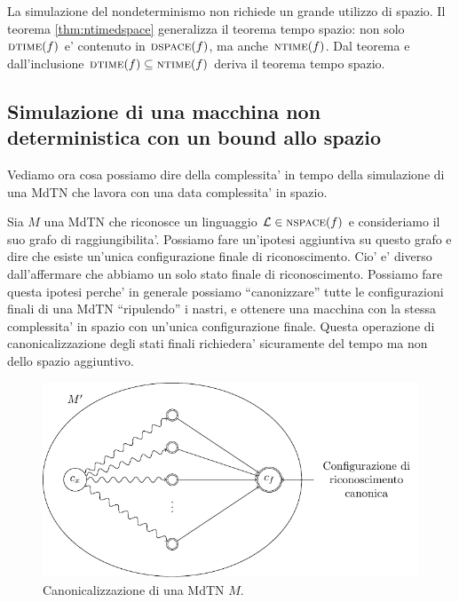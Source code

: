 La simulazione del nondeterminismo non richiede un grande utilizzo di spazio. Il teorema
\ref{thm:ntimedspace} generalizza il teorema tempo spazio: non solo $\textsc{dtime}(f)$ e' contenuto in
$\textsc{dspace}(f)$, ma anche $\textsc{ntime}(f)$. Dal teorema e dall'inclusione $\textsc{dtime}(f) \subseteq \textsc{ntime}(f)$
deriva il teorema tempo spazio.

\subsection{Simulazione di una macchina non deterministica con un bound allo spazio}

Vediamo ora cosa possiamo dire della complessita' in tempo della simulazione di una MdTN che lavora
con una data complessita' in spazio.

Sia $M$ una MdTN che riconosce un linguaggio $\mathcal{L} \in \textsc{nspace}(f)$ e consideriamo il suo grafo di
raggiungibilita'. Possiamo fare un'ipotesi aggiuntiva su questo grafo e dire che esiste un'unica
configurazione finale di riconoscimento. Cio' e' diverso dall'affermare che abbiamo un solo stato
finale di riconoscimento. Possiamo fare questa ipotesi perche' in generale possiamo ``canonizzare''
tutte le configurazioni finali di una MdTN ``ripulendo'' i nastri, e ottenere una macchina con la
stessa complessita' in spazio con un'unica configurazione finale. Questa operazione di
canonicalizzazione degli stati finali richiedera' sicuramente del tempo ma non dello spazio
aggiuntivo.

\begin{figure}[h]
    \begin{center}
        \includegraphics[scale=0.7]{./img/nondeterminism/Canonicalization.pdf}
        \caption{Canonicalizzazione di una MdTN $M$.}
    \end{center}
\end{figure}

